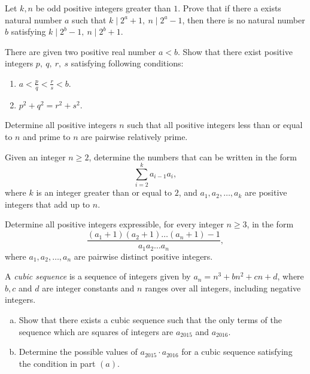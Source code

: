 \documentclass[problems.tex]{subfile}
\begin{document}
	\begin{problem}
		Let $k, n$ be odd positive integers greater than $1$. Prove that if there a exists natural number $a$ such that $k\mid 2^a+1, \ n\mid 2^a-1$, then there is no natural number $b$ satisfying $k\mid 2^b-1, \ n\mid 2^b+1$. %
	\end{problem}

	\begin{problem}
		There are given two positive real number $a<b$. Show that there exist positive integers $p, \ q, \ r, \ s$ satisfying following conditions:
		\begin{enumerate}
			\item $a< \frac{p}{q} < \frac{r}{s} < b$.
			\item $p^2+q^2=r^2+s^2$.
		\end{enumerate}
	\end{problem}

	\begin{problem}
		Determine all positive integers $n$ such that all positive integers less than or equal to $n$ and prime to $n$ are pairwise relatively prime.
	\end{problem}

	\begin{problem}
		Given an integer $n \geq 2$, determine the numbers that can be written in
		the form $$ \sum_{i=2}^{k} a_{i-1}a_i,$$ where $k$ is an integer greater than or equal to $2$, and $a_1,a_2,\dots, a_k$ are positive integers that add up to $n$.
	\end{problem}


	\begin{problem}
		Determine all positive integers expressible, for every integer $n \geq 3$,
		in the form $$\frac{(a_1 + 1)(a_2 + 1) \dots (a_n + 1) - 1}{a_1a_2\dots a_n},$$ where $a_1, a_2, \dots, a_n$ are pairwise distinct positive integers.
	\end{problem}



	\begin{problem}
		A \textit{cubic sequence} is a sequence of integers given by $a_n =n^3 + bn^2 + cn + d$, where $b, c$ and $d$ are integer constants and $n$ ranges over all integers, including negative integers.
		\begin{enumerate}[(a)]
			\item Show that there exists a cubic sequence such that the only terms
			of the sequence which are squares of integers are $a_{2015}$ and $a_{2016}$.
			\item Determine the possible values of $a_{2015} \cdot a_{2016}$ for a cubic sequence
			satisfying the condition in part $(a)$.
		\end{enumerate}
	\end{problem}
\end{document}

